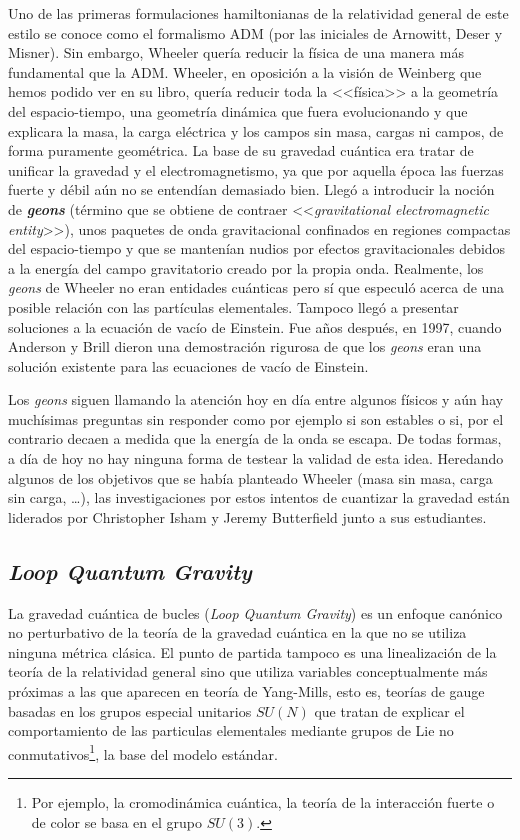 \documentclass[11pt,a4paper,titlepage]{article}
\begin{document}
Uno de las primeras formulaciones hamiltonianas de la relatividad general de este estilo se conoce como el formalismo ADM (por las iniciales de Arnowitt, Deser y Misner). Sin embargo, Wheeler quería reducir la física de una manera más fundamental que la ADM. Wheeler, en oposición a la visión de Weinberg que hemos podido ver en su libro, quería reducir toda la <<física>> a la geometría del espacio-tiempo, una geometría dinámica que fuera evolucionando y que explicara la masa, la carga eléctrica y los campos sin masa, cargas ni campos, de forma puramente geométrica. La base de su gravedad cuántica era tratar de unificar la gravedad y el electromagnetismo, ya que por aquella época las fuerzas fuerte y débil aún no se entendían demasiado bien. Llegó a introducir la noción de \textbf{\emph{geons}} (término que se obtiene de contraer <<\emph{gravitational electromagnetic entity}>>), unos paquetes de onda gravitacional confinados en regiones compactas del espacio-tiempo y que se mantenían nudios por efectos gravitacionales debidos a la energía del campo gravitatorio creado por la propia onda. Realmente, los \emph{geons} de Wheeler no eran entidades cuánticas pero sí que especuló acerca de una posible relación con las partículas elementales. Tampoco llegó a presentar soluciones a la ecuación de vacío de Einstein. Fue años después, en 1997, cuando Anderson y Brill \cite{geons} dieron una demostración rigurosa de que los \emph{geons} eran una solución existente para las ecuaciones de vacío de Einstein.

Los \emph{geons} siguen llamando la atención hoy en día entre algunos físicos y aún hay muchísimas preguntas sin responder como por ejemplo si son estables o si, por el contrario decaen a medida que la energía de la onda se escapa. De todas formas, a día de hoy no hay ninguna forma de testear la validad de esta idea. Heredando algunos de los objetivos que se había planteado Wheeler (masa sin masa, carga sin carga, \dots), las investigaciones por estos intentos de cuantizar la gravedad están liderados por Christopher Isham y Jeremy Butterfield junto a sus estudiantes.

\subsection{\textit{Loop Quantum Gravity}}

La gravedad cuántica de bucles (\textit{Loop Quantum Gravity}) es un enfoque canónico no perturbativo de la teoría de la gravedad cuántica en la que no se utiliza ninguna métrica clásica. El punto de partida tampoco es una linealización de la teoría de la relatividad general sino que utiliza variables conceptualmente más próximas a las que aparecen en teoría de Yang-Mills, esto es, teorías de gauge basadas en los grupos especial unitarios $SU(N)$ que tratan de explicar el comportamiento de las particulas elementales mediante grupos de Lie no conmutativos\footnote{Por ejemplo, la cromodinámica cuántica, la teoría de la interacción fuerte o de color se basa en el grupo $SU(3)$.}, la base del modelo estándar.
\end{document}
